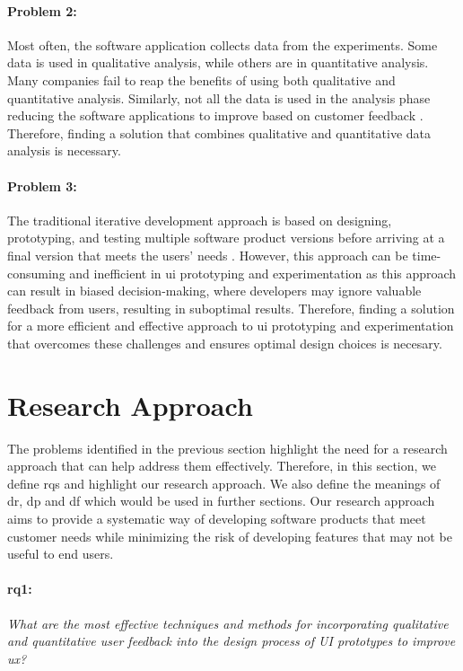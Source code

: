 \paragraph{Problem 2:} Most often, the software application collects data from the experiments. 
Some data is used in qualitative analysis, while others are in quantitative analysis.
Many companies fail to reap the benefits of using both qualitative and quantitative analysis.
Similarly, not all the data is used in the analysis phase reducing the software applications to improve based on customer feedback \cite{article:datadrive:brian}.
Therefore, finding a solution that combines qualitative and quantitative data analysis is necessary.

\paragraph{Problem 3:} 
The traditional iterative development approach is based on designing, prototyping, and testing multiple software product versions before arriving at a final version that meets the users' needs \cite{article:experiments:lindgren}.
However, this approach can be time-consuming and inefficient in \ac{ui} prototyping and experimentation as this approach can result in biased decision-making, where developers may ignore valuable feedback from users, resulting in suboptimal results.
Therefore, finding a solution for a more efficient and effective approach to \ac{ui} prototyping and experimentation that overcomes these challenges and ensures optimal design choices is necesary.

\clearpage
\section{Research Approach}  %
\label{introduction:section:research}
The problems identified in the previous section highlight the need for a research approach that can help address them effectively.
Therefore, in this section, we define \ac{rq}s and highlight our research approach. 
We also define the meanings of \ac{dr}, \ac{dp} and \ac{df} which would be used in further sections.
Our research approach aims to provide a systematic way of developing software products that meet customer needs while minimizing the risk of developing features that may not be useful to end users.

\paragraph{\ac{rq}1:} \textit{What are the most effective techniques and methods for incorporating qualitative and quantitative user feedback into the design process of UI prototypes to improve \ac{ux}?}
